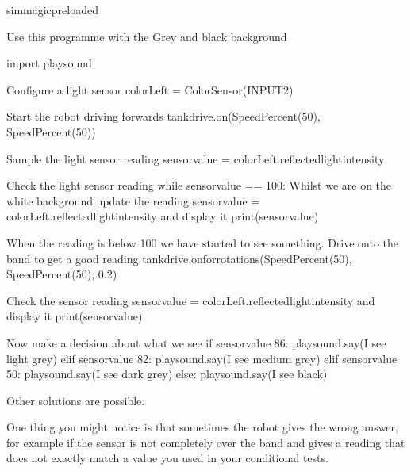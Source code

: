 \documentclass[letterpaper,10pt,english]{sphinxmanual}
\begin{document}
{
\begin{sphinxVerbatim}[commandchars=\\\{\}]
\llap{\color{nbsphinxin}[ ]:\,\hspace{\fboxrule}\hspace{\fboxsep}}\PYGZpc{}\PYGZpc{}sim\PYGZus{}magic\PYGZus{}preloaded

\PYGZsh{} Use this programme with the \PYGZdq{}Grey and black\PYGZdq{} background

import playsound

\PYGZsh{} Configure a light sensor
colorLeft = ColorSensor(INPUT\PYGZus{}2)

\PYGZsh{} Start the robot driving forwards
tank\PYGZus{}drive.on(SpeedPercent(50), SpeedPercent(50))

\PYGZsh{}Sample the light sensor reading
sensor\PYGZus{}value = colorLeft.reflected\PYGZus{}light\PYGZus{}intensity

\PYGZsh{}Check the light sensor reading
while sensor\PYGZus{}value == 100:
    \PYGZsh{} Whilst we are on the white background
    \PYGZsh{} update the reading
    sensor\PYGZus{}value = colorLeft.reflected\PYGZus{}light\PYGZus{}intensity
    \PYGZsh{} and display it
    print(sensor\PYGZus{}value)

\PYGZsh{} When the reading is below 100
\PYGZsh{} we have started to see something.
\PYGZsh{} Drive onto the band to get a good reading
tank\PYGZus{}drive.on\PYGZus{}for\PYGZus{}rotations(SpeedPercent(50), SpeedPercent(50), 0.2)

\PYGZsh{}Check the sensor reading
sensor\PYGZus{}value = colorLeft.reflected\PYGZus{}light\PYGZus{}intensity
\PYGZsh{} and display it
print(sensor\PYGZus{}value)

\PYGZsh{} Now make a decision about what we see
if sensor\PYGZus{}value \PYGZgt{}  86:
    playsound.say(\PYGZdq{}I see light grey\PYGZdq{})
elif sensor\PYGZus{}value \PYGZgt{} 82:
    playsound.say(\PYGZdq{}I see medium grey\PYGZdq{})
elif sensor\PYGZus{}value \PYGZgt{} 50:
    playsound.say(\PYGZdq{}I see dark grey\PYGZdq{})
else:
    playsound.say(\PYGZdq{}I see black\PYGZdq{})
\end{sphinxVerbatim}
}

Other solutions are possible.

One thing you might notice is that sometimes the robot gives the wrong answer, for example if the sensor is not completely over the band and gives a reading that does not exactly match a value you used in your conditional tests.
\end{document}
